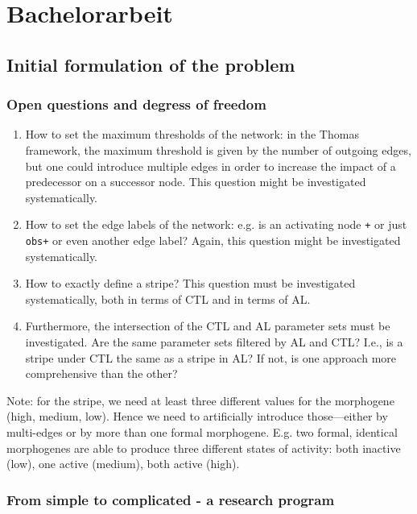 \documentclass{article}
\begin{document}
\section{Bachelorarbeit}

\subsection{Initial formulation of the problem}

\subsubsection{Open questions and degress of freedom}

\begin{enumerate}
  \item How to set the maximum thresholds of the network: in the Thomas
  framework, the maximum threshold is given by the number of outgoing edges, but
  one could introduce multiple edges in order to increase the impact of a
  predecessor on a successor node. This question might be investigated
  systematically.
  \item How to set the edge labels of the network: e.g. is an activating node
  {\tt +} or just {\tt obs+} or even another edge label? Again, this question
  might be investigated systematically.
  \item How to exactly define a stripe? This question must be investigated
  systematically, both in terms of CTL and in terms of AL.
  \item Furthermore, the intersection of the CTL and AL parameter sets must be
  investigated. Are the same parameter sets filtered by AL and CTL? I.e., is a
  stripe under CTL the same as a stripe in AL? If not, is one approach more
  comprehensive than the other?
\end{enumerate}

Note: for the stripe, we need at least three different values for the morphogene
(high, medium, low). Hence we need to artificially introduce those---either by
multi-edges or by more than one formal morphogene. E.g. two formal, identical
morphogenes are able to produce three different states of activity: both
inactive (low), one active (medium), both active (high).

\subsubsection{From simple to complicated - a research program}
\end{document}
